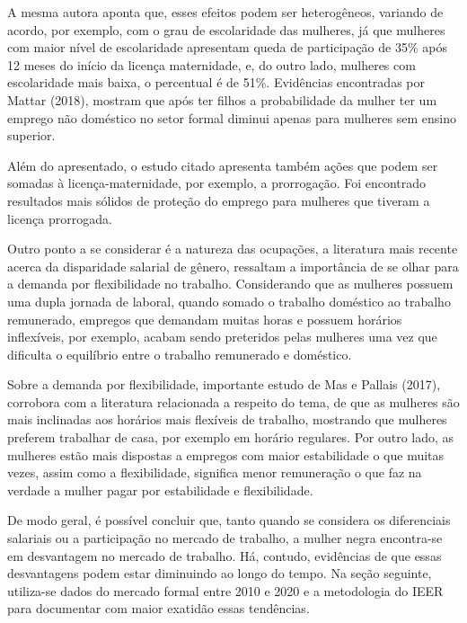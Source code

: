 \documentclass[12pt]{article}
\begin{document}
\par A mesma autora aponta que, esses efeitos podem ser heterogêneos, variando de acordo, por exemplo, com o grau de escolaridade das mulheres, já que mulheres com maior nível de escolaridade apresentam queda de participação de 35\% após 12 meses do início da licença maternidade, e, do outro lado, mulheres com escolaridade mais baixa, o percentual é de 51\%. Evidências encontradas por Mattar (2018), mostram que após ter filhos a probabilidade da mulher ter um emprego não doméstico no setor formal diminui apenas para mulheres sem ensino superior.

\par Além do apresentado, o estudo citado apresenta também ações que podem ser somadas à licença-maternidade, por exemplo, a prorrogação. Foi encontrado resultados mais sólidos de proteção do emprego para mulheres que tiveram a licença prorrogada.

\par Outro ponto a se considerar é a natureza das ocupações, a literatura mais recente acerca da disparidade salarial de gênero, ressaltam a importância de se olhar para a demanda por flexibilidade no trabalho. Considerando que as mulheres possuem uma dupla jornada de laboral, quando somado o trabalho doméstico ao trabalho remunerado, empregos que demandam muitas horas e possuem horários inflexíveis, por exemplo, acabam sendo preteridos pelas mulheres uma vez que dificulta o equilíbrio entre o trabalho remunerado e doméstico. 

\par Sobre a demanda por flexibilidade, importante estudo de Mas e Pallais (2017), corrobora com a literatura relacionada a respeito do tema, de que as mulheres são mais inclinadas aos horários mais flexíveis de trabalho, mostrando que mulheres preferem trabalhar de casa, por exemplo em horário regulares. Por outro lado, as mulheres estão mais dispostas a empregos com maior estabilidade o que muitas vezes, assim como a flexibilidade, significa menor remuneração o que faz na verdade a mulher pagar por estabilidade e flexibilidade. 


\par De modo geral, é possível concluir que, tanto quando se considera os diferenciais salariais ou a participação no mercado de trabalho, a mulher negra encontra-se em desvantagem no mercado de trabalho. Há, contudo, evidências de que essas desvantagens podem estar diminuindo ao longo do tempo. Na seção seguinte, utiliza-se dados do mercado formal entre 2010 e 2020 e a metodologia do IEER para documentar com maior exatidão essas tendências.
\end{document}
